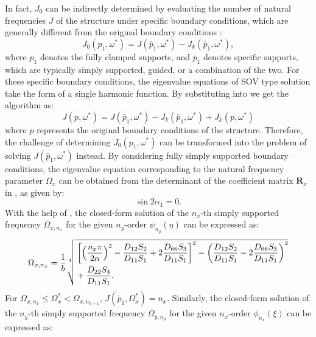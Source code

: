 \documentclass[preprint,12pt]{elsarticle}
\begin{document}
In fact, $ J_0 $ can be indirectly determined by evaluating the number of natural frequencies $ J $ of the structure under specific boundary conditions, which are generally different from the original boundary conditions \cite{han2018improved}:
%
\begin{equation}\label{eq:J_o_pin}
	J_0(p_1,\omega^*) = J(\bar{p}_1,\omega^*) - J_k(\bar{p}_1,\omega^*),
\end{equation}
%
where $ p_1 $ denotes the fully clamped supports, and $ \bar{p}_1 $ denotes specific supports, which are typically simply supported, guided, or a combination of the two.
For these specific boundary conditions, the eigenvalue equations of SOV type solution take the form of a single harmonic function.
By substituting  into  we get the algorithm as:  
%
\begin{equation}\label{eq:new_WWalgorithm}
	J(p,\omega^*) = J(\bar{p}_1,\omega^*) - J_k(\bar{p}_1,\omega^*) + J_k(p,\omega^*)
\end{equation} 
%
where $p$ represents the original boundary conditions of the structure.
Therefore, the challenge of determining $J_0(p_1, \omega^*)$ can be transformed into the problem of solving $ J(\bar{p}_1, \omega^*)$ instead. 
By considering fully simply supported boundary conditions, the eigenvalue equation corresponding to the natural frequency parameter $ \Omega_x $ can be obtained from the determinant of the coefficient matrix $ \mathbf{R}_x $ in , as given by:
%
\begin{equation}\label{eq:SSx} 
	\sin 2\alpha_1 = 0.
\end{equation}
%
With the help of , the closed-form solution of the $n_x$-th simply supported frequency $\Omega_{x,n_x}$ for the given $n_y$-order $\psi_{n_y}(\eta)$ can be expressed as:
%
\begin{equation}\label{eq:J_simpx}
	\Omega_{x,n_x} =
	\frac{1}{b} \sqrt[4]{%
		\begin{aligned}
			&\left[\left(\frac{n_x\pi}{2\alpha}\right)^2 - \frac{D_{12}S_2}{D_{11}S_1} + 2 \frac{D_{66}S_3}{D_{11}S_1}\right]^2 - \left(\frac{D_{12}S_2}{D_{11}S_1} - 2 \frac{D_{66}S_3}{D_{11}S_1}\right)^2 \\
			&+ \frac{D_{22}S_4}{D_{11}S_1}.
		\end{aligned}
	}
\end{equation}
%
For $\Omega_{x,n_x} \leq \Omega_x^* < \Omega_{x,n_{x+1}}$, $J(\bar{p}_1, \Omega_x^*) = n_x$.
Similarly, the closed-form solution of the $n_y$-th simply supported frequency $\Omega_{y,n_y}$ for the given $n_x$-order $\phi_{n_x}(\xi)$ can be expressed as:
\end{document}

